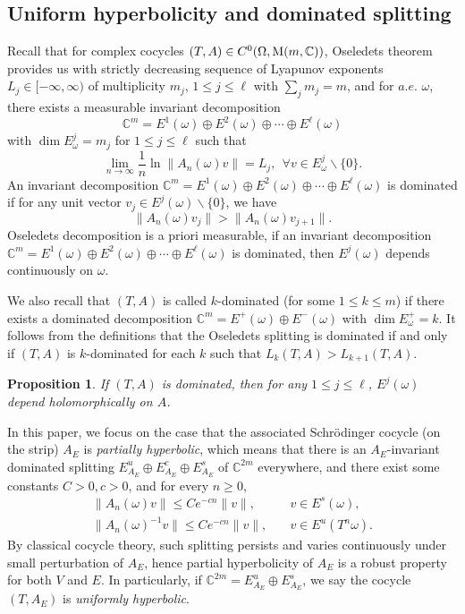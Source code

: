 \documentclass[11pt]{amsart}
\newtheorem{proposition}[theorem]{Proposition}
\theoremstyle{remark}
\theoremstyle{definition}
\newcommand{\C}{{\mathbf C}}
\newcommand{\CC}{{\mathbb C}}
\def \C{{\mathcal{C}}}
\def\C{{\mathbb C}}
\begin{document}
\subsection{Uniform hyperbolicity and dominated splitting}\label{secds}
 Recall that
for complex cocycles $(T,A)\in C^0(\Omega,{\rm M}(m,\C))$, Oseledets theorem provides us with  strictly decreasing
sequence of Lyapunov exponents $L_j \in [-\infty,\infty)$ of multiplicity $m_j$, $1\leq j \leq \ell$ with $\sum_{j}m_j=m$, and for $a.e.$ $\omega$, there exists
a measurable invariant decomposition $$\C^m=E^{1}(\omega)\oplus E^2(\omega)\oplus\cdots\oplus E^{\ell}(\omega)$$ with $\dim E_\omega^j=m_j$ for $1\leq j\leq \ell$ such that $$
\lim\limits_{n\rightarrow\infty}\frac{1}{n}\ln\|A_n(\omega)v\|=L_j,\ \  \forall v\in E_\omega^j\backslash\{0\}.
$$
An invariant decomposition $\C^m=E^{1}(\omega)\oplus E^2(\omega)\oplus\cdots\oplus E^{\ell}{(\omega)}$  is   dominated if for any unit vector $v_j\in E^j(\omega)\backslash \{0\}$, we have $$\|A_n(\omega)v_j\|>\|A_n(\omega)v_{j+1}\|.$$
Oseledets decomposition is a priori measurable,  if an invariant decomposition $\CC^m=E^{1}(\omega)\oplus E^2(\omega)\oplus\cdots\oplus E^{\ell}(\omega)$  is   dominated, then $E^j(\omega)$ depends  continuously on $\omega$.

We also recall that  $(T,A)$  is called $k$-dominated (for some $1\leq k\leq m$) if there exists a dominated decomposition $\CC^m=E^+(\omega) \oplus E^-(\omega) $    with $\dim E^+_\omega =k.$  It follows from the definitions that the Oseledets splitting is dominated if and only if $(T,A)$ is $k$-dominated for each $k$ such that  $L_k(T,A)> L_{k+1}(T,A)$.

\begin{proposition}\label{lem: Hol dep AJS}\cite{AJS}If 
$(T,A)$ is dominated, then for any $1\leq j\leq \ell$,   $E^j(\omega)$ depend holomorphically on $A$.
\end{proposition}
   



In this paper, we focus on the case that the associated Schr\"odinger cocycle (on the strip) $A_E$ is {\it partially hyperbolic}, which means that there is an $A_E$-invariant dominated splitting $E^u_{A_E}\oplus E^c_{A_E}\oplus E^s_{A_E}$ of $\CC^{2m}$ everywhere, and  there exist  some constants $C>0,c>0$, and for every $n\geqslant 0$,
$$
\begin{aligned}
	\| A_n(\omega)v\| \leqslant Ce^{-cn}\| v\|, \quad & v\in E^s(\omega),\\
	\| A_n(\omega)^{-1}v\| \leqslant Ce^{-cn}\|v\|,  \quad & v\in E^u(T^n\omega).
\end{aligned}
$$ 
By classical cocycle theory, such splitting persists and varies continuously under small perturbation of $A_E$, hence partial hyperbolicity of $A_E$ is a robust property for both $V$ and $E$. 
In particularly, if $\CC^{2m}=E^u_{A_E}\oplus E^s_{A_E}$, we say the  cocycle $(T, A_E)$ is {\it uniformly hyperbolic}.
\end{document}
